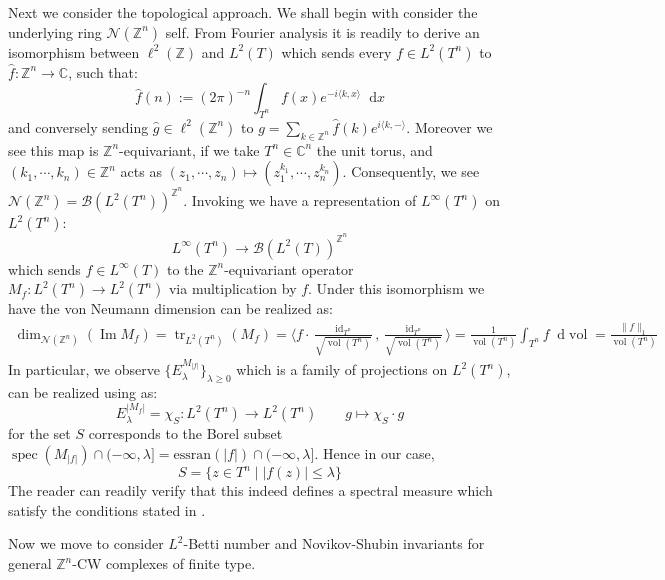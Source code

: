 \documentclass[11pt]{report}
\theoremstyle{definition}
\theoremstyle{plain}
\DeclareMathOperator{\tr}{tr}
\DeclareMathOperator{\id}{id}
\DeclareMathOperator{\im}{Im}
\DeclareMathOperator{\spec}{spec}
\DeclareMathOperator{\vol}{vol}
\newcommand{\complex}{\mathbb{C}}
\newcommand{\integer}{\mathbb{Z}}
\newcommand{\vna}{\mathcal{N}}
\newcommand{\brac}[1]{\langle #1 \rangle}
\renewcommand{\hat}{\widehat}
\newcommand{\norm}[1]{\lVert #1 \rVert}
\newcommand{\mass}[1]{\mathop{}\mathrm{d}{#1}}
\begin{document}
\bigskip

Next we consider the topological approach. We shall begin with consider the underlying ring $\vna(\integer^n)$ self. From Fourier analysis it is readily to derive an isomorphism between $\ell^2(\integer)$ and $L^2(T)$ which sends every $f\in L^2(T^n)$ to $\hat{f}:\integer^n \to \complex$, such that:
\begin{equation}
\hat{f}(n):=(2\pi)^{-n}\int_{T^n}f(x)e^{-i\brac{k,x}}\mass{x}
\end{equation}
and conversely sending $\hat{g}\in \ell^2(\integer^n)$ to $g=\sum_{k\in \integer^n}\hat{f}(k)e^{i\brac{k, -}}$. Moreover we see this map is $\integer^n$-equivariant, if we take $T^n\in \complex^n$ the unit torus, and $(k_1, \cdots, k_n)\in \integer^n$ acts as $(z_1, \cdots, z_n)\mapsto (z_1^{k_1}, \cdots, z_n^{k_n})$. Consequently, we see $\vna(\integer^n)=\mathcal{B}(L^2(T^n))^{\integer^n}$. Invoking  we have a representation  of $L^\infty(T^n)$ on $L^2(T^n)$:
\begin{equation}
L^\infty(T^n) \to \mathcal{B}(L^2(T))^{\integer^n}
\end{equation}
which sends $f\in L^\infty(T)$ to the $\integer^n$-equivariant operator $M_f:L^2(T^n)\to L^2(T^n)$ via multiplication by $f$. Under this isomorphism we have the von Neumann dimension can be realized as:
\begin{equation}
\begin{split}
\dim_{\vna(\integer^n)}(\im M_f)=\tr_{L^2(T^n)}(M_f)=\brac{f\cdot \frac{\id_{T^n}}{\sqrt{\vol(T^n)}}, \frac{\id_{T^n}}{\sqrt{\vol(T^n)}}}=\frac{1}{\vol(T^n)}\int_{T^n}f\mass{\vol}=\frac{\norm{f}_{1}}{\vol(T^n)}
\end{split}
\end{equation}
In particular, we observe $\{E^{M_{|f|}}_\lambda\}_{\lambda\geq 0}$ which is a family of projections on $L^2(T^n)$, can be realized using  as:
\begin{equation}
E^{|M_f|}_\lambda= \chi_S: L^2(T^n)\to L^2(T^n) \qquad g\mapsto \chi_S\cdot g
\end{equation}
for the set $S$ corresponds to the Borel subset $\spec(M_{|f|})\cap (-\infty, \lambda]=\mathrm{essran}(|f|)\cap (-\infty, \lambda]$. Hence in our case,
\begin{equation*}
S=\{z\in T^n\mid |f(z)|\leq\lambda\}
\end{equation*}
The reader can readily verify that this indeed defines a spectral measure which satisfy the conditions stated in .
\par Now we move to consider $L^2$-Betti number and Novikov-Shubin invariants for general $\integer^n$-CW complexes of finite type.
\end{document}
